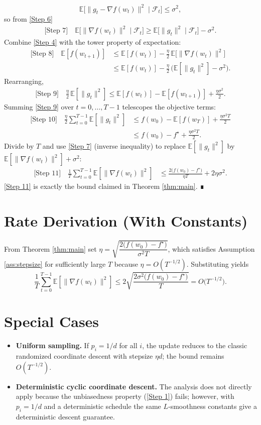 \documentclass[11pt]{article}
\newcommand{\E}{\mathbb{E}}
\newcommand{\grad}{\nabla}
\begin{document}
\[
\E\!\bigl[\|g_t-\grad f(w_t)\|^{2}\mid\mathcal{F}_t\bigr]\le\sigma^{2},
\]
so from \eqref{Step 6}
\begin{align}
\text{[Step 7]} \quad 
\E\!\bigl[\|\grad f(w_t)\|^{2}\mid\mathcal{F}_t\bigr]
\ge \E\!\bigl[\|g_t\|^{2}\mid\mathcal{F}_t\bigr]-\sigma^{2}.
\end{align}
Combine \eqref{Step 4} with the tower property of expectation:
\begin{align}
\text{[Step 8]} \quad 
\E[f(w_{t+1})]
&\le \E[f(w_t)]-\frac{\eta}{2}\,\E\!\bigl[\|\grad f(w_t)\|^{2}\bigr] \nonumber\\
&\le \E[f(w_t)]-\frac{\eta}{2}\,
      \bigl(\E[\|g_t\|^{2}]-\sigma^{2}\bigr).
\end{align}
Rearranging,
\begin{align}
\text{[Step 9]} \quad 
\frac{\eta}{2}\,\E[\|g_t\|^{2}]
\le \E[f(w_t)]-\E[f(w_{t+1})] +\frac{\eta\sigma^{2}}{2}.
\end{align}
Summing \eqref{Step 9} over $t=0,\dots,T-1$ telescopes the objective terms:
\begin{align}
\text{[Step 10]} \quad 
\frac{\eta}{2}\sum_{t=0}^{T-1}\E[\|g_t\|^{2}]
&\le f(w_0)-\E[f(w_T)] +\frac{\eta\sigma^{2}T}{2} \nonumber\\
&\le f(w_0)-f^{\star} +\frac{\eta\sigma^{2}T}{2}.
\end{align}
Divide by $T$ and use \eqref{Step 7} (inverse inequality) to replace $\E[\|g_t\|^{2}]$ by $\E[\|\grad f(w_t)\|^{2}]+\sigma^{2}$:
\begin{align}
\text{[Step 11]} \quad 
\frac{1}{T}\sum_{t=0}^{T-1}\E[\|\grad f(w_t)\|^{2}]
&\le \frac{2\bigl(f(w_0)-f^{\star}\bigr)}{\eta T}
   +2\eta\sigma^{2}.
\end{align}
\eqref{Step 11} is exactly the bound claimed in Theorem \ref{thm:main}. ∎

\section*{Rate Derivation (With Constants)}
From Theorem \ref{thm:main} set $\eta = \sqrt{\dfrac{2\bigl(f(w_0)-f^{\star}\bigr)}{\sigma^{2}T}}$, which satisfies Assumption \ref{ass:stepsize} for sufficiently large $T$ because $\eta=O(T^{-1/2})$. Substituting yields
\[
\frac{1}{T}\sum_{t=0}^{T-1}\E[\|\grad f(w_t)\|^{2}]
\le 2\sqrt{\frac{2\sigma^{2}\bigl(f(w_0)-f^{\star}\bigr)}{T}}
= O\!\bigl(T^{-1/2}\bigr).
\]

\section*{Special Cases}
\begin{itemize}[leftmargin=*]
\item \textbf{Uniform sampling.} If $p_i=1/d$ for all $i$, the update reduces to the classic randomized coordinate descent with stepsize $\eta d$; the bound remains $O(T^{-1/2})$.
\item \textbf{Deterministic cyclic coordinate descent.} The analysis does not directly apply because the unbiasedness property (\ref{Step 1}) fails; however, with $p_i=1/d$ and a deterministic schedule the same $L$‑smoothness constants give a deterministic descent guarantee.
\end{itemize}
\end{document}
